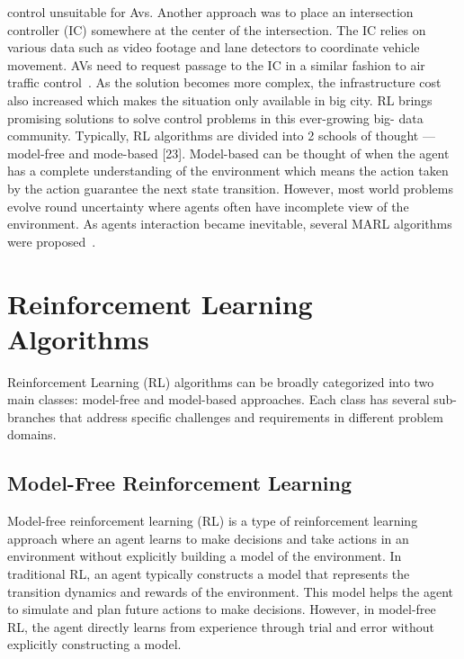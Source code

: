 control unsuitable for Avs.
Another approach was to place an
intersection controller (IC) somewhere at the center of the
intersection.
The IC relies on various data such as video
footage and lane detectors to coordinate vehicle movement.
AVs need to request passage to the IC in a similar fashion to
air traffic control~\cite{li2021planning, gunarathna2022intelligent, qian2017autonomous, chen2019intersection}.
As the solution becomes more
complex, the infrastructure cost also increased which makes
the situation only available in big city.
RL brings promising
solutions to solve control problems in this ever-growing big-
data community.
Typically, RL algorithms are divided into 2
schools of thought — model-free and mode-based [23].
Model-based can be thought of when the agent has a complete
understanding of the environment which means the action
taken by the action guarantee the next state transition.
However, most world problems evolve round uncertainty
where agents often have incomplete view of the environment.
As agents interaction became inevitable, several MARL
algorithms were proposed~\cite{peng2021learning, yang2018mean, johanson2021emergent, tang2020towards, oroojlooyjadid2019review, siekmann1998agent, zhou2020smarts, zhang2019multiagent}.
\section{Reinforcement Learning Algorithms}

Reinforcement Learning (RL) algorithms can be broadly categorized into two main classes: model-free and model-based approaches. Each class has several sub-branches that address specific challenges and requirements in different problem domains.

\subsection{Model-Free Reinforcement Learning}\label{subsec:model-free-reinforcement-learning}
Model-free reinforcement learning (RL) is a type of reinforcement learning approach where an agent learns to make decisions and take actions in an environment without explicitly building a model of the environment. In traditional RL, an agent typically constructs a model that represents the transition dynamics and rewards of the environment. This model helps the agent to simulate and plan future actions to make decisions. However, in model-free RL, the agent directly learns from experience through trial and error without explicitly constructing a model.

